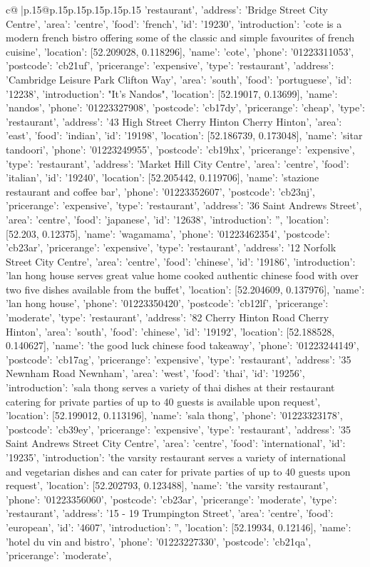 \documentclass{article}
\begin{document}
{\begin{supertabular}{c@{$\;$}|p{.15\linewidth}@{}p{.15\linewidth}p{.15\linewidth}p{.15\linewidth}p{.15\linewidth}p{.15\linewidth}}
{{{'restaurant'}, {'address': 'Bridge Street City Centre', 'area': 'centre', 'food': 'french', 'id': '19230', 'introduction': 'cote is a modern french bistro offering some of the classic and simple favourites of french cuisine', 'location': [52.209028, 0.118296], 'name': 'cote', 'phone': '01223311053', 'postcode': 'cb21uf', 'pricerange': 'expensive', 'type': 'restaurant'}, {'address': 'Cambridge Leisure Park Clifton Way', 'area': 'south', 'food': 'portuguese', 'id': '12238', 'introduction': "It's Nandos", 'location': [52.19017, 0.13699], 'name': 'nandos', 'phone': '01223327908', 'postcode': 'cb17dy', 'pricerange': 'cheap', 'type': 'restaurant'}, {'address': '43 High Street Cherry Hinton Cherry Hinton', 'area': 'east', 'food': 'indian', 'id': '19198', 'location': [52.186739, 0.173048], 'name': 'sitar tandoori', 'phone': '01223249955', 'postcode': 'cb19hx', 'pricerange': 'expensive', 'type': 'restaurant'}, {'address': 'Market Hill City Centre', 'area': 'centre', 'food': 'italian', 'id': '19240', 'location': [52.205442, 0.119706], 'name': 'stazione restaurant and coffee bar', 'phone': '01223352607', 'postcode': 'cb23nj', 'pricerange': 'expensive', 'type': 'restaurant'}, {'address': '36 Saint Andrews Street', 'area': 'centre', 'food': 'japanese', 'id': '12638', 'introduction': '', 'location': [52.203, 0.12375], 'name': 'wagamama', 'phone': '01223462354', 'postcode': 'cb23ar', 'pricerange': 'expensive', 'type': 'restaurant'}, {'address': '12 Norfolk Street City Centre', 'area': 'centre', 'food': 'chinese', 'id': '19186', 'introduction': 'lan hong house serves great value home cooked authentic chinese food with over two five dishes available from the buffet', 'location': [52.204609, 0.137976], 'name': 'lan hong house', 'phone': '01223350420', 'postcode': 'cb12lf', 'pricerange': 'moderate', 'type': 'restaurant'}, {'address': '82 Cherry Hinton Road Cherry Hinton', 'area': 'south', 'food': 'chinese', 'id': '19192', 'location': [52.188528, 0.140627], 'name': 'the good luck chinese food takeaway', 'phone': '01223244149', 'postcode': 'cb17ag', 'pricerange': 'expensive', 'type': 'restaurant'}, {'address': '35 Newnham Road Newnham', 'area': 'west', 'food': 'thai', 'id': '19256', 'introduction': 'sala thong serves a variety of thai dishes at their restaurant catering for private parties of up to 40 guests is available upon request', 'location': [52.199012, 0.113196], 'name': 'sala thong', 'phone': '01223323178', 'postcode': 'cb39ey', 'pricerange': 'expensive', 'type': 'restaurant'}, {'address': '35 Saint Andrews Street City Centre', 'area': 'centre', 'food': 'international', 'id': '19235', 'introduction': 'the varsity restaurant serves a variety of international and vegetarian dishes and can cater for private parties of up to 40 guests upon request', 'location': [52.202793, 0.123488], 'name': 'the varsity restaurant', 'phone': '01223356060', 'postcode': 'cb23ar', 'pricerange': 'moderate', 'type': 'restaurant'}, {'address': '15 - 19 Trumpington Street', 'area': 'centre', 'food': 'european', 'id': '4607', 'introduction': '', 'location': [52.19934, 0.12146], 'name': 'hotel du vin and bistro', 'phone': '01223227330', 'postcode': 'cb21qa', 'pricerange': 'moderate', }}}
\end{supertabular}}
\end{document}
